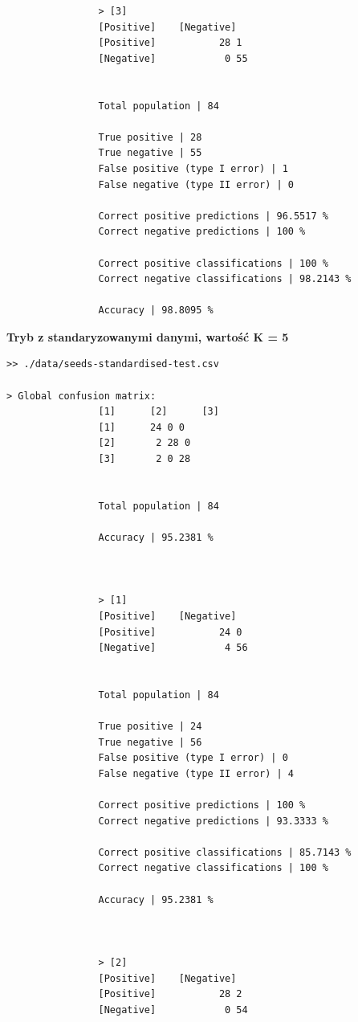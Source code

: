\documentclass{classrep}
\begin{document}
{{{\begin{lstlisting}
                > [3]
                [Positive]    [Negative]
                [Positive]           28 1
                [Negative]            0 55


                Total population | 84

                True positive | 28
                True negative | 55
                False positive (type I error) | 1
                False negative (type II error) | 0

                Correct positive predictions | 96.5517 %
                Correct negative predictions | 100 %

                Correct positive classifications | 100 %
                Correct negative classifications | 98.2143 %

                Accuracy | 98.8095 %

                \end{lstlisting}
                \textbf{Tryb z standaryzowanymi danymi, wartość K = 5}
                \begin{lstlisting}
>> ./data/seeds-standardised-test.csv

> Global confusion matrix:
                [1]      [2]      [3]
                [1]      24 0 0
                [2]       2 28 0
                [3]       2 0 28


                Total population | 84

                Accuracy | 95.2381 %



                > [1]
                [Positive]    [Negative]
                [Positive]           24 0
                [Negative]            4 56


                Total population | 84

                True positive | 24
                True negative | 56
                False positive (type I error) | 0
                False negative (type II error) | 4

                Correct positive predictions | 100 %
                Correct negative predictions | 93.3333 %

                Correct positive classifications | 85.7143 %
                Correct negative classifications | 100 %

                Accuracy | 95.2381 %



                > [2]
                [Positive]    [Negative]
                [Positive]           28 2
                [Negative]            0 54



\end{lstlisting}}}}
\end{document}
